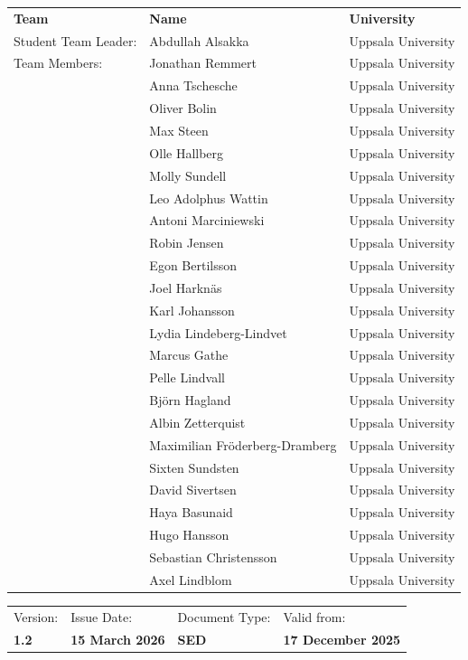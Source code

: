 \begin{titlepage}
\begin{tabular}{l l l}
  \textbf{Team}        & \textbf{Name} & \textbf{University}\\
  Student Team Leader: & Abdullah Alsakka & Uppsala University \\
  Team Members: & Jonathan Remmert & Uppsala University \\
    & Anna Tschesche & Uppsala University \\
    & Oliver Bolin & Uppsala University\\
    & Max Steen & Uppsala University \\
    & Olle Hallberg & Uppsala University \\
    & Molly Sundell & Uppsala University \\
    & Leo Adolphus Wattin & Uppsala University \\
    & Antoni Marciniewski & Uppsala University \\
    & Robin Jensen & Uppsala University \\
    & Egon Bertilsson & Uppsala University \\
    & Joel Harknäs & Uppsala University \\
    & Karl Johansson & Uppsala University \\
    & Lydia Lindeberg-Lindvet & Uppsala University \\
    & Marcus Gathe & Uppsala University \\
    & Pelle Lindvall & Uppsala University \\
    & Björn Hagland & Uppsala University \\
    & Albin Zetterquist & Uppsala University \\
    & Maximilian Fröderberg-Dramberg & Uppsala University \\
    & Sixten Sundsten & Uppsala University \\
    & David Sivertsen & Uppsala University \\
    & Haya Basunaid & Uppsala University \\
    & Hugo Hansson & Uppsala University \\
    & Sebastian Christensson & Uppsala University \\
    & Axel Lindblom & Uppsala University \\   
\end{tabular}

\enlargethispage{3cm}

\begin{tabular}{llll}
  Version:        & Issue Date:               & Document Type: & Valid from: \\
  \textbf{1.2}      & \textbf{15 March 2026}    & \textbf{SED}  & \textbf{17 December 2025}
\end{tabular}


\end{titlepage}
